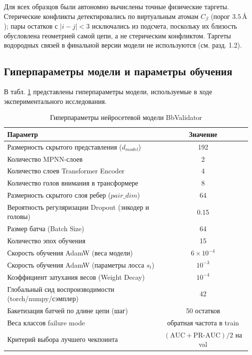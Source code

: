 \documentclass[12pt, a4paper]{article}
\begin{document}
Для всех образцов были автономно вычислены точные физические таргеты. Стерические конфликты детектировались по виртуальным атомам $C_\beta$ (порог $3.5\,\text{\AA}$); пары остатков с $|i-j| < 3$ исключались из подсчета, поскольку их близость обусловлена геометрией самой цепи, а не стерическим конфликтом. Таргеты водородных связей в финальной версии модели не используются (см. разд. 1.2).

\subsection{Гиперпараметры модели и параметры обучения}
В табл. \ref{tab:hyperparams} представлены гиперпараметры модели, используемые в ходе экспериментального исследования.

\begin{table}[h]
\centering
\caption{Гиперпараметры нейросетевой модели BbValidator}
\label{tab:hyperparams}
\begin{tabular}{lc}
\toprule
\textbf{Параметр} & \textbf{Значение} \\
\midrule
Размерность скрытого представления ($d_{model}$) & 192 \\
Количество MPNN-слоев & 2 \\
Количество слоев Transformer Encoder & 4 \\
Количество голов внимания в трансформере & 8 \\
Размерность скрытого слоя ребер ($pair\_dim$) & 64 \\
Вероятность регуляризации Dropout (энкодер и головы) & 0.15 \\
Размер батча (Batch Size) & 64 \\
Количество эпох обучения & 15 \\
Скорость обучения AdamW (веса модели) & $6 \times 10^{-4}$ \\
Скорость обучения AdamW (параметры лосса $s_t$) & $10^{-3}$ \\
Коэффициент затухания весов (Weight Decay) & $10^{-4}$ \\
Глобальный сид воспроизводимости (torch/numpy/сэмплер) & 42 \\
Бакетизация батчей по длине цепи (шаг) & 50 остатков \\
Веса классов failure mode & обратная частота в train \\
Критерий выбора лучшего чекпоинта & $(\mathrm{AUC} + \mathrm{PR\text{-}AUC})/2$ на val \\
\bottomrule
\end{tabular}
\end{table}
\end{document}
